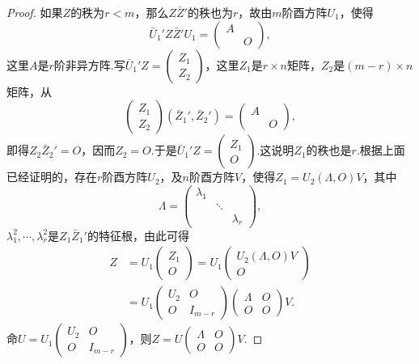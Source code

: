 \begin{proof}
如果$Z$的秩为$r<m$，那么$Z\bar{Z}'$的秩也为$r$，故由$m$阶酉方阵$U_1$，使得
\[\bar{U}_1' Z\bar{Z}' U_1=\begin{pmatrix}
	A & \\
	& O
\end{pmatrix},\]
这里$A$是$r$阶非异方阵.写$\bar{U}_1' Z=\left(\begin{array}{c}
	Z_1\\
	Z_2
\end{array}\right)$，这里$Z_1$是$r\times n$矩阵，$Z_2$是$(m-r)\times n$矩阵，从
\[\left(\begin{array}{c}
	Z_1\\
	Z_2
\end{array}\right)\left(\bar{Z}_1',\bar{Z}_2'\right)=\begin{pmatrix}
A & \\
  & O
\end{pmatrix},\]
即得$Z_2\bar{Z}_2'=O$，因而$Z_2=O$.于是$\bar{U}_1'Z=\left(\begin{array}{c}
	Z_1\\
	O
\end{array}\right)$.这说明$Z_1$的秩也是$r$.根据上面已经证明的，存在$r$阶酉方阵$U_2$，及$n$阶酉方阵$V$，使得$Z_1=U_2(\Lambda,O)V$，其中
\[\Lambda=\begin{pmatrix}
	\lambda_1 & &\\
	&\ddots&\\
	&&\lambda_r
\end{pmatrix},\]
$\lambda_1^2,\cdots,\lambda_r^2$是$Z_1\bar{Z}_1'$的特征根，由此可得
\begin{align*}
	Z
	&=U_1\left(\begin{array}{c}
		Z_1\\
		O
	\end{array}\right)=U_1\left(\begin{array}{c}
	U_2(\Lambda,O)V\\
	O
\end{array}\right)\\
&=U_1\begin{pmatrix}
	U_2 & O\\
	O & I_{m-r}
\end{pmatrix}\begin{pmatrix}
\Lambda & O\\
O&O
\end{pmatrix}V.
\end{align*}
命$U=U_1\begin{pmatrix}
	U_2 & O\\
	O & I_{m-r}
\end{pmatrix}$，则$Z=U\begin{pmatrix}
\Lambda & O\\
O & O
\end{pmatrix}V$.
\end{proof}
